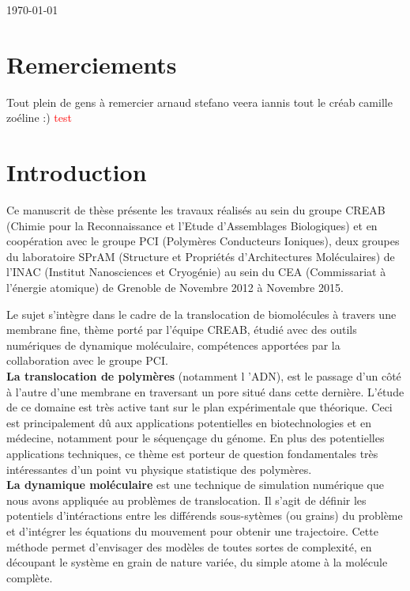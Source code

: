 \documentclass[a4paper,11pt]{article}
\begin{document}
\begin{flushright}
\today
\end{flushright}

\vfill
\hfill 




\setlength{\parindent}{10pt}

\newpage

\section*{Remerciements}

Tout plein de gens à remercier
arnaud stefano veera iannis tout le créab camille zoéline :)
\textcolor{red}{test}

\newpage

\section*{Introduction}

Ce manuscrit de thèse présente les travaux réalisés au sein du groupe CREAB (Chimie pour la Reconnaissance et l’Etude d’Assemblages Biologiques) et en coopération avec le groupe PCI (Polymères Conducteurs Ioniques), deux groupes du laboratoire SPrAM (Structure et Propriétés d'Architectures Moléculaires) de l'INAC (Institut Nanosciences et Cryogénie) au sein du CEA (Commissariat à l'énergie atomique) de Grenoble de Novembre 2012 à Novembre 2015.

Le sujet s'intègre dans le cadre de la translocation de biomolécules à travers une membrane fine, thème porté par l'équipe CREAB, étudié avec des outils numériques de dynamique moléculaire, compétences apportées par la collaboration avec le groupe PCI. \\

\textbf{La translocation de polymères} (notamment l 'ADN), est le passage d'un c\^{o}té à l'autre d'une membrane en traversant un pore situé dans cette dernière. L'étude de ce domaine est très active tant sur le plan expérimentale que théorique. Ceci est principalement d\^{u} aux applications potentielles en biotechnologies et en médecine, notamment pour le séquençage du génome. En plus des potentielles applications techniques, ce thème est porteur de question fondamentales très intéressantes d'un point vu physique statistique des polymères.\\

\textbf{La dynamique moléculaire} est une technique de simulation numérique que nous avons appliquée au problèmes de translocation. Il s'agit de définir les potentiels d'intéractions entre les différends sous-sytèmes (ou grains) du problème et d'intégrer les équations du mouvement pour obtenir une trajectoire. Cette méthode permet d'envisager des modèles de toutes sortes de complexité, en découpant le système en grain de nature variée, du simple atome à la molécule complète.\\
\end{document}

